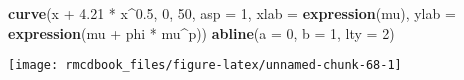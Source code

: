 \documentclass[9pt,a5paper,]{book}
\newenvironment{Shaded}{}{}
\newcommand{\KeywordTok}[1]{\textbf{{#1}}}
\newcommand{\DataTypeTok}[1]{\underline{{#1}}}
\newcommand{\DecValTok}[1]{{#1}}
\newcommand{\FloatTok}[1]{{#1}}
\newcommand{\StringTok}[1]{{#1}}
\newcommand{\NormalTok}[1]{{#1}}
\renewenvironment{Shaded}{\color{inputcolor}}{}
\renewcommand{\DataTypeTok}[1]{{#1}}
\theoremstyle{definition}
\theoremstyle{definition}
\theoremstyle{remark}
\begin{document}
\begin{Shaded}
\begin{Highlighting}[]
\KeywordTok{curve}\NormalTok{(x +}\StringTok{ }\FloatTok{4.21} \NormalTok{*}\StringTok{ }\NormalTok{x^}\FloatTok{0.5}\NormalTok{, }\DecValTok{0}\NormalTok{, }\DecValTok{50}\NormalTok{, }\DataTypeTok{asp =} \DecValTok{1}\NormalTok{,}
      \DataTypeTok{xlab =} \KeywordTok{expression}\NormalTok{(mu),}
      \DataTypeTok{ylab =} \KeywordTok{expression}\NormalTok{(mu +}\StringTok{ }\NormalTok{phi *}\StringTok{ }\NormalTok{mu^p))}
\KeywordTok{abline}\NormalTok{(}\DataTypeTok{a =} \DecValTok{0}\NormalTok{, }\DataTypeTok{b =} \DecValTok{1}\NormalTok{, }\DataTypeTok{lty =} \DecValTok{2}\NormalTok{)}
\end{Highlighting}
\end{Shaded}

\begin{center}\texttt{[image: rmcdbook\_files/figure-latex/unnamed-chunk-68-1]} \end{center}


\end{document}
